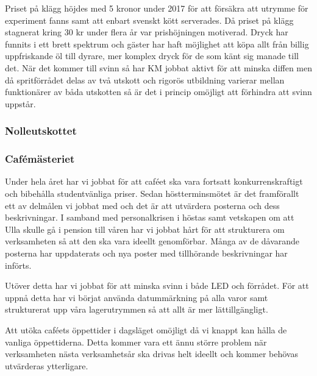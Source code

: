 \documentclass[../_main/handlingar.tex]{subfiles}
\begin{document}
Priset på klägg höjdes med 5 kronor under 2017 för att försäkra att utrymme för experiment fanns samt att enbart svenskt kött serverades. Då priset på klägg stagnerat kring 30 kr under flera år var prishöjningen motiverad. Dryck har funnits i ett brett spektrum och gäster har haft möjlighet att köpa allt från billig uppfriskande öl till dyrare, mer komplex dryck för de som känt sig manade till det. När det kommer till svinn så har KM jobbat aktivt för att minska diffen men då spritförrådet delas av två utskott och rigorös utbildning varierar mellan funktionärer av båda utskotten så är det i princip omöjligt att förhindra att svinn uppstår.

\subsubsection*{Nolleutskottet}

\subsubsection*{Cafémästeriet}
Under hela året har vi jobbat för att caféet ska vara fortsatt konkurrenskraftigt och bibehålla studentvänliga priser. Sedan höstterminsmötet är det framförallt ett av delmålen vi jobbat med och det är att utvärdera posterna och dess beskrivningar. I samband med personalkrisen i höstas samt vetskapen om att Ulla skulle gå i pension till våren har vi jobbat hårt för att strukturera om verksamheten så att den ska vara ideellt genomförbar. Många av de dåvarande posterna har uppdaterats och nya poster med tillhörande beskrivningar har införts.

Utöver detta har vi jobbat för att minska svinn i både LED och förrådet. För att uppnå detta har vi börjat använda datummärkning på alla varor samt strukturerat upp våra lagerutrymmen så att allt är mer lättillgängligt.

Att utöka caféets öppettider i dagsläget omöjligt då vi knappt kan hålla de vanliga öppettiderna. Detta kommer vara ett ännu större problem när verksamheten nästa verksamhetsår ska drivas helt ideellt och kommer behövas utvärderas ytterligare.
\end{document}
